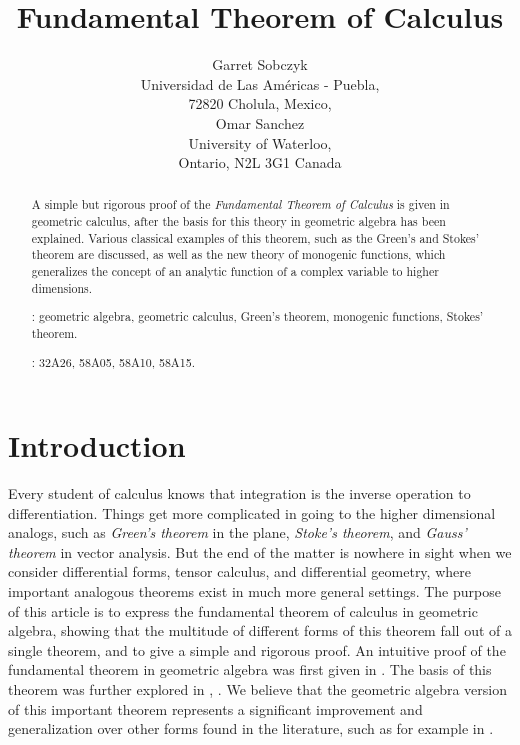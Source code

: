 \documentclass[12]{article}
\begin{document}
   
\title{Fundamental Theorem of Calculus}


\author{Garret Sobczyk   \\ 
Universidad de Las Am\'ericas - Puebla,\\ 72820 Cholula, Mexico, \\
Omar Sanchez\\ University of Waterloo, \\ Ontario, N2L 3G1 Canada}

\maketitle

\begin{abstract} A simple but rigorous proof of the {\it Fundamental Theorem of Calculus} is given
in geometric calculus, after the basis for this theory in geometric algebra has been explained. 
Various classical examples of this theorem, such as the Green's and Stokes' theorem are discussed,
as well as the new theory of monogenic functions, which generalizes the concept of an analytic function
of a complex variable to higher dimensions.
  
: geometric algebra, geometric calculus, Green's theorem, monogenic functions,
 Stokes' theorem. 
 
 : 32A26, 58A05, 58A10, 58A15.
  
 \end{abstract}

\section*{Introduction}

  Every student of calculus knows that integration is the inverse operation to differentiation.
Things get more complicated in going to the higher dimensional analogs, such as {\it Green's theorem} in the
plane, {\it Stoke's theorem}, and {\it Gauss' theorem} in vector analysis. But the end of the matter
is nowhere in sight when we consider differential forms, tensor calculus, and differential geometry,
where important analogous theorems exist in much more general settings. The purpose of this article is
to express the fundamental theorem of calculus in geometric algebra, showing that 
the multitude of different forms of this theorem fall out of a single theorem,
and to give a simple and rigorous proof. An intuitive proof of the fundamental theorem
in geometric algebra was first given in \cite{H68}. The basis of this theorem was further explored in
 \cite{Simsob}, \cite{omar}. We believe that the geometric algebra version of this
important theorem represents a significant improvement and generalization over other forms found in the literature,
such as for example in \cite{flanders}.
\end{document}

